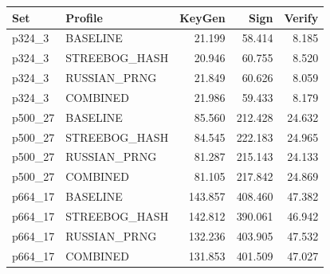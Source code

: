 \begin{tabular}{llrrr}
Set & Profile & KeyGen & Sign & Verify \\
\hline
p324\_3 & BASELINE & 21.199 & 58.414 & 8.185 \\
p324\_3 & STREEBOG\_HASH & 20.946 & 60.755 & 8.520 \\
p324\_3 & RUSSIAN\_PRNG & 21.849 & 60.626 & 8.059 \\
p324\_3 & COMBINED & 21.986 & 59.433 & 8.179 \\
p500\_27 & BASELINE & 85.560 & 212.428 & 24.632 \\
p500\_27 & STREEBOG\_HASH & 84.545 & 222.183 & 24.965 \\
p500\_27 & RUSSIAN\_PRNG & 81.287 & 215.143 & 24.133 \\
p500\_27 & COMBINED & 81.105 & 217.842 & 24.869 \\
p664\_17 & BASELINE & 143.857 & 408.460 & 47.382 \\
p664\_17 & STREEBOG\_HASH & 142.812 & 390.061 & 46.942 \\
p664\_17 & RUSSIAN\_PRNG & 132.236 & 403.905 & 47.532 \\
p664\_17 & COMBINED & 131.853 & 401.509 & 47.027 \\
\end{tabular}
